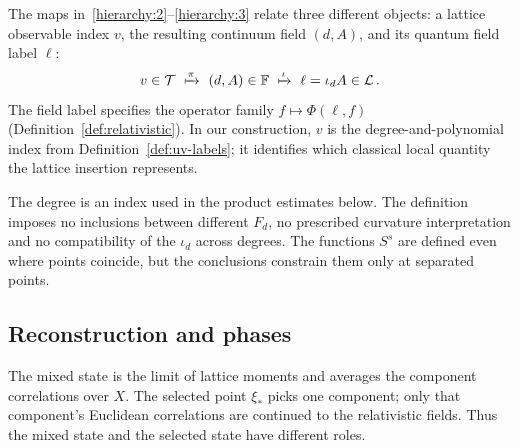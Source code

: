 The maps in~\ref{hierarchy:2}--\ref{hierarchy:3} relate three different objects: a lattice observable index $v$, the resulting continuum field $(d,A)$, and its quantum field label $\ell$:
\begin{equation}\label{eq:observable-field-maps}
v\in\mathcal T\ \xmapsto{\pi}\ (d,A)\in\mathbb F
\ \xmapsto{\iota}\ \ell=\iota_d A\in\mathcal L\,.
\end{equation}
The field label specifies the operator family $f\mapsto\Phi(\ell,f)$ (Definition~\ref{def:relativistic}).
In our construction, $v$ is the degree-and-polynomial index from Definition~\ref{def:uv-labels}; it identifies which classical local quantity the lattice insertion represents.

The degree is an index used in the product estimates below.
The definition imposes no inclusions between different $F_d$, no prescribed curvature interpretation and no compatibility of the $\iota_d$ across degrees.
The functions $S^s$ are defined even where points coincide, but the conclusions constrain them only at separated points.

\subsection{Reconstruction and phases}\label{subsec:reconstruction}

The mixed state is the limit of lattice moments and averages the component correlations over $X$.
The selected point $\xi_*$ picks one component; only that component's Euclidean correlations are continued to the relativistic fields.
Thus the mixed state and the selected state have different roles.

